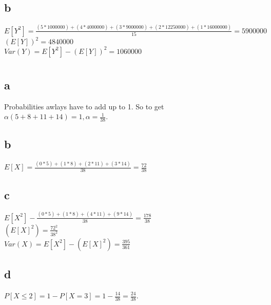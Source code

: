 \documentclass[12pt]{article}
\begin{document}
\subsection*{b}
\(E[Y^2] = \frac{(5 * 1000000) + (4 * 4000000) + (3 * 9000000) + (2 * 12250000) + (1* 16000000)}{15} = 5900000\)\\
\((E[Y])^2 = 4840000\)\\
\(Var(Y) = E[Y^2] - (E[Y])^2 = 1060000\)\\
\section{}
\subsection*{a}
Probabilities awlays have to add up to 1. So to get \(\alpha(5 + 8 + 11 + 14) = 1, \alpha = \frac{1}{38}\).
\subsection*{b}
\(E[X] = \frac{(0 * 5) + (1 * 8) + (2 * 11) + (3 * 14)}{38} = \frac{72}{38}\)
\subsection*{c}
\(E[X^2] - \frac{(0 * 5) + (1 * 8) + (4 * 11) + (9 * 14)}{38} = \frac{178}{38}\)\\
\((E[X]^2) = \frac{72^2}{38^2}\)\\
\(Var(X) = E[X^2] - (E[X]^2) = \frac{395}{361}\)
\subsection*{d}
\(P[X \leq 2] = 1 - P[X=3] = 1 - \frac{14}{38} = \frac{24}{38}\).
\end{document}
